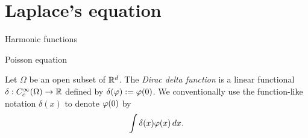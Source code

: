 \documentclass{../../large}
\begin{document}
\section{Laplace's equation}

{Harmonic functions}
\begin{prb}
\end{prb}
\begin{prb}
\end{prb}


\begin{prb}
\end{prb}
\begin{prb}
\end{prb}
\begin{prb}
\end{prb}


{Poisson equation}
\begin{prb}

\end{prb}
\begin{prb}
Let $\Omega$ be an open subset of $\mathbb{R}^d$.
The \emph{Dirac delta function} is a linear functional $\delta:C_c^\infty(\Omega)\to\mathbb{R}$ defined by $\delta(\varphi):=\varphi(0)$.
We conventionally use the function-like notation $\delta(x)$ to denote $\varphi(0)$ by
\[\int\delta(x)\varphi(x)\,dx.\]


\end{prb}
\end{document}
